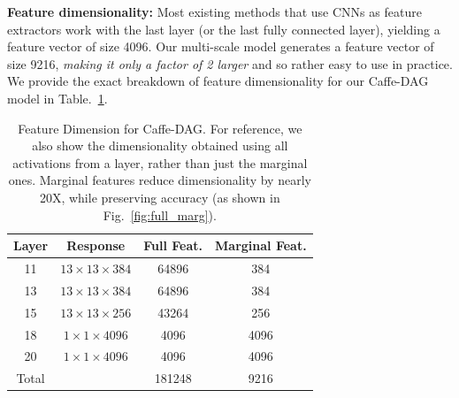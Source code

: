 \documentclass[10pt,twocolumn,letterpaper]{article}
\begin{document}
{\bf Feature dimensionality:} Most existing methods that use CNNs as feature extractors work with the last layer (or the last fully connected layer), yielding a feature vector of size 4096. Our multi-scale model generates a feature vector of size 9216, {\em making it only a factor of 2 larger} and so rather easy to use in practice. We provide the exact breakdown of feature dimensionality for our Caffe-DAG model in Table.~\ref{table:feat_dim}.
\begin{table}[t!]
\begin{center}
\begin{tabular}{|c|c|c|c|}
\hline
Layer & Response &  Full Feat.& Marginal Feat.\\
\hline
11 & $13\times 13 \times 384$ & 64896 & 384 \\
13 & $13\times 13 \times 384$ & 64896 & 384 \\
15 & $13\times 13 \times 256$ & 43264 & 256 \\
18 & $1\times 1 \times 4096$ & 4096 & 4096 \\
20 & $1\times 1 \times 4096$ & 4096 & 4096 \\
\hline
Total& & 181248 & 9216\\
\hline
\end{tabular}
\end{center}
\caption{Feature Dimension for Caffe-DAG. For reference, we also show the dimensionality obtained using all activations from a layer, rather than just the marginal ones. Marginal features reduce dimensionality by nearly 20X, while preserving accuracy (as shown in Fig.~\ref{fig:full_marg}).}
\label{table:feat_dim}
\end{table}
\end{document}
